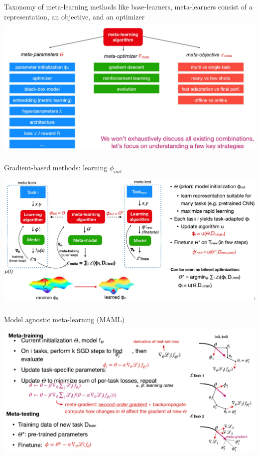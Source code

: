 \documentclass[aspectratio=169,t,handout,xcolor={usenames,dvipsnames}]{beamer}
\begin{document}
\begin{frame}{Taxonomy of meta-learning methods}
    \small like base-learners, meta-learners consist of a representation, an objective, and an optimizer
    \centering\includegraphics[height=7cm]{image/Jietu20220329-004820.jpg}
\end{frame}
\begin{frame}{Gradient-based methods: learning $\phi_{init}$}
    \centering\includegraphics[height=7cm]{image/Jietu20220329-005015.jpg}
\end{frame}
\begin{frame}{Model agnostic meta-learning (MAML)}
    \centering\includegraphics[height=7cm]{image/Jietu20220329-005114.jpg}
\end{frame}
\end{document}
